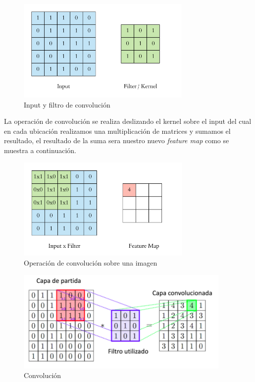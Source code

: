 \begin{figure}[H]
 \centering
  \includegraphics[height=5cm,keepaspectratio=true,clip=true]{imagenes/MarcoTeorico/convoluc_1.png}
  \caption{Input y filtro de convolución}\label{Fig:filter}
\end{figure}

La operación de convolución se realiza deslizando el kernel sobre el input del cual en cada ubicación realizamos una multiplicación de matrices y sumamos el resultado, el resultado de la suma sera nuestro nuevo \textit{feature map} como se muestra a continuación.

\begin{figure}[H]
 \centering
  \includegraphics[height=5cm,keepaspectratio=true,clip=true]{imagenes/MarcoTeorico/convoluc_2.png}
  \caption{Operación de convolución sobre una imagen} 
\end{figure}


\begin{figure}[H]
 \centering
  \includegraphics[height=5cm,keepaspectratio=true,clip=true]{imagenes/MarcoTeorico/convolucion.png}
  \caption{Convolución} \label{Fig:convolucion}
\end{figure}

